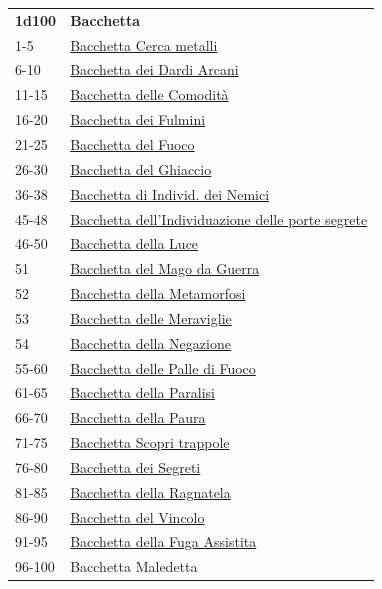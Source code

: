 \begin{multicols}{2}
{{\small\begin{tabularx}{0.45\textwidth}{lX}
\textbf{1d100} & \textbf{Bacchetta}\\
1-5 & \hyperlink{BacchettaCercametalli}{Bacchetta Cerca metalli}\\
6-10 & \hyperlink{BacchettadeiDardiArcani}{Bacchetta dei Dardi Arcani}\\
11-15 & \hyperlink{BacchettadelleComodità}{Bacchetta delle Comodità}\\
16-20 & \hyperlink{BacchettadeiFulmini}{Bacchetta dei Fulmini}\\
21-25 & \hyperlink{BacchettadelFuoco}{Bacchetta del Fuoco}\\
26-30 & \hyperlink{BacchettadelGhiaccio}{Bacchetta del Ghiaccio}\\
36-38 & \hyperlink{BacchettadiIndivid.deiNemici}{Bacchetta di Individ. dei Nemici}\\
45-48 & \hyperlink{Bacchettadell'Individuazionedelleportesegrete}{Bacchetta dell'Individuazione delle porte segrete}\\
46-50 & \hyperlink{BacchettadellaLuce}{Bacchetta della Luce}\\
51 & \hyperlink{BacchettadelMagodaGuerra}{Bacchetta del Mago da Guerra}\\
52 & \hyperlink{BacchettadellaMetamorfosi}{Bacchetta della Metamorfosi}\\
53 & \hyperlink{BacchettadelleMeraviglie}{Bacchetta delle Meraviglie}\\
54 & \hyperlink{BacchettadellaNegazione}{Bacchetta della Negazione}\\
55-60 & \hyperlink{BacchettadellePallediFuoco}{Bacchetta delle Palle di Fuoco}\\
61-65 & \hyperlink{BacchettadellaParalisi}{Bacchetta della Paralisi}\\
66-70 & \hyperlink{BacchettadellaPaura}{Bacchetta della Paura}\\
71-75 & \hyperlink{BacchettaScopritrappole}{Bacchetta Scopri trappole}\\
76-80 & \hyperlink{BacchettadeiSegreti}{Bacchetta dei Segreti}\\
81-85 & \hyperlink{BacchettadellaRagnatela}{Bacchetta della Ragnatela}\\
86-90 & \hyperlink{BacchettadelVincolo}{Bacchetta del Vincolo}\\
91-95 & \hyperlink{BacchettadellaFugaAssistita}{Bacchetta della Fuga Assistita}\\
96-100 & Bacchetta Maledetta
\end{tabularx}}

}
\end{multicols}
